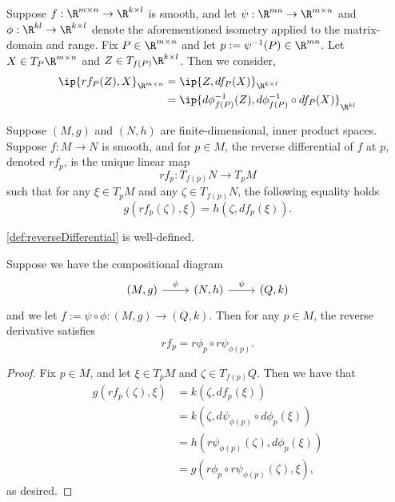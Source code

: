 Suppose $f:\R^{m\times n}\to\R^{k\times l}$ is smooth, and let $\psi:\R^{mn}\to\R^{m\times n}$ and $\phi:\R^{kl}\to\R^{k\times l}$ denote the aforementioned isometry applied to the matrix-domain and range.  Fix $P\in\R^{m\times n}$ and let $p:=\psi^{-1}(P)\in\R^{mn}$.  Let $X\in T_P\R^{m\times n}$ and $Z\in T_{f(P)}\R^{k\times l}$.  Then we consider,
\begin{align*}
	\ip{rf_P(Z),X}_{\R^{m\times n}}&=\ip{Z, df_P(X)}_{\R^{k\times l}}\\
	&=\ip{d\phi^{-1}_{f(P)}(Z),d\phi^{-1}_{f(P)}\circ df_P(X)}_{\R^{kl}}
\end{align*}

\begin{defn}\label{def:reverseDifferential}
	Suppose $(M,g)$ and $(N,h)$ are finite-dimensional, inner product spaces.  Suppose $f:M\to N$ is smooth, and for $p\in M$, the reverse differential of $f$ at $p$, denoted $rf_p$, is the unique linear map
	$$rf_p:T_{f(p)}N\to T_pM$$
	such that for any $\xi\in T_pM$ and any $\zeta\in T_{f(p)}N$, the following equality holds
	$$g(rf_p(\zeta),\xi)=h(\zeta,df_p(\xi)).$$
\end{defn}

\begin{thm}
	\cref{def:reverseDifferential} is well-defined.
\end{thm}


\begin{prop}
	Suppose we have the compositional diagram
	\begin{equation*}
		\begin{tikzcd}
			(M,g)
			\arrow[r, "\phi"]
			&(N, h)
			\arrow[r, "\psi"]
			&(Q,k)
		\end{tikzcd}
	\end{equation*}
	and we let $f:=\psi\circ\phi:(M,g)\to(Q,k).$
	Then for any $p\in M$, the reverse derivative satisfies
	$$rf_p=r\phi_p\circ r\psi_{\phi(p)}.$$
\end{prop}

\begin{proof}
Fix $p\in M$, and let $\xi\in T_pM$ and $\zeta\in T_{f(p)}Q$.  Then we have that
\begin{align*}
	g(rf_p(\zeta),\xi)&=k(\zeta,df_p(\xi))\\
	&=k(\zeta,d\psi_{\phi(p)}\circ d\phi_p(\xi))\\
	&=h(r\psi_{\phi(p)}(\zeta),d\phi_p(\xi))\\
	&=g(r\phi_p\circ r\psi_{\phi(p)}(\zeta),\xi),
\end{align*}
as desired.
\end{proof}

